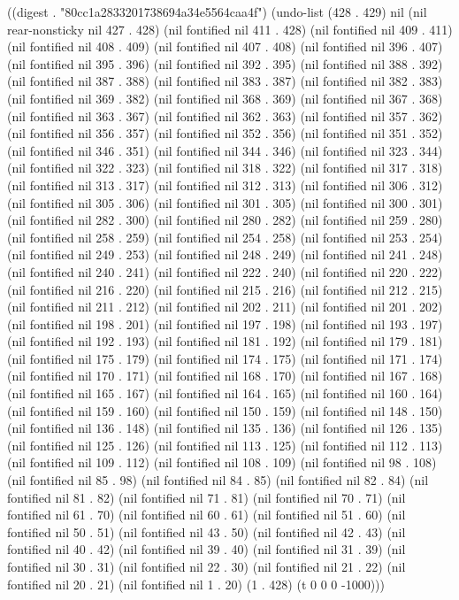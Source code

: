 
((digest . "80cc1a2833201738694a34e5564caa4f") (undo-list (428 . 429) nil (nil rear-nonsticky nil 427 . 428) (nil fontified nil 411 . 428) (nil fontified nil 409 . 411) (nil fontified nil 408 . 409) (nil fontified nil 407 . 408) (nil fontified nil 396 . 407) (nil fontified nil 395 . 396) (nil fontified nil 392 . 395) (nil fontified nil 388 . 392) (nil fontified nil 387 . 388) (nil fontified nil 383 . 387) (nil fontified nil 382 . 383) (nil fontified nil 369 . 382) (nil fontified nil 368 . 369) (nil fontified nil 367 . 368) (nil fontified nil 363 . 367) (nil fontified nil 362 . 363) (nil fontified nil 357 . 362) (nil fontified nil 356 . 357) (nil fontified nil 352 . 356) (nil fontified nil 351 . 352) (nil fontified nil 346 . 351) (nil fontified nil 344 . 346) (nil fontified nil 323 . 344) (nil fontified nil 322 . 323) (nil fontified nil 318 . 322) (nil fontified nil 317 . 318) (nil fontified nil 313 . 317) (nil fontified nil 312 . 313) (nil fontified nil 306 . 312) (nil fontified nil 305 . 306) (nil fontified nil 301 . 305) (nil fontified nil 300 . 301) (nil fontified nil 282 . 300) (nil fontified nil 280 . 282) (nil fontified nil 259 . 280) (nil fontified nil 258 . 259) (nil fontified nil 254 . 258) (nil fontified nil 253 . 254) (nil fontified nil 249 . 253) (nil fontified nil 248 . 249) (nil fontified nil 241 . 248) (nil fontified nil 240 . 241) (nil fontified nil 222 . 240) (nil fontified nil 220 . 222) (nil fontified nil 216 . 220) (nil fontified nil 215 . 216) (nil fontified nil 212 . 215) (nil fontified nil 211 . 212) (nil fontified nil 202 . 211) (nil fontified nil 201 . 202) (nil fontified nil 198 . 201) (nil fontified nil 197 . 198) (nil fontified nil 193 . 197) (nil fontified nil 192 . 193) (nil fontified nil 181 . 192) (nil fontified nil 179 . 181) (nil fontified nil 175 . 179) (nil fontified nil 174 . 175) (nil fontified nil 171 . 174) (nil fontified nil 170 . 171) (nil fontified nil 168 . 170) (nil fontified nil 167 . 168) (nil fontified nil 165 . 167) (nil fontified nil 164 . 165) (nil fontified nil 160 . 164) (nil fontified nil 159 . 160) (nil fontified nil 150 . 159) (nil fontified nil 148 . 150) (nil fontified nil 136 . 148) (nil fontified nil 135 . 136) (nil fontified nil 126 . 135) (nil fontified nil 125 . 126) (nil fontified nil 113 . 125) (nil fontified nil 112 . 113) (nil fontified nil 109 . 112) (nil fontified nil 108 . 109) (nil fontified nil 98 . 108) (nil fontified nil 85 . 98) (nil fontified nil 84 . 85) (nil fontified nil 82 . 84) (nil fontified nil 81 . 82) (nil fontified nil 71 . 81) (nil fontified nil 70 . 71) (nil fontified nil 61 . 70) (nil fontified nil 60 . 61) (nil fontified nil 51 . 60) (nil fontified nil 50 . 51) (nil fontified nil 43 . 50) (nil fontified nil 42 . 43) (nil fontified nil 40 . 42) (nil fontified nil 39 . 40) (nil fontified nil 31 . 39) (nil fontified nil 30 . 31) (nil fontified nil 22 . 30) (nil fontified nil 21 . 22) (nil fontified nil 20 . 21) (nil fontified nil 1 . 20) (1 . 428) (t 0 0 0 -1000)))
